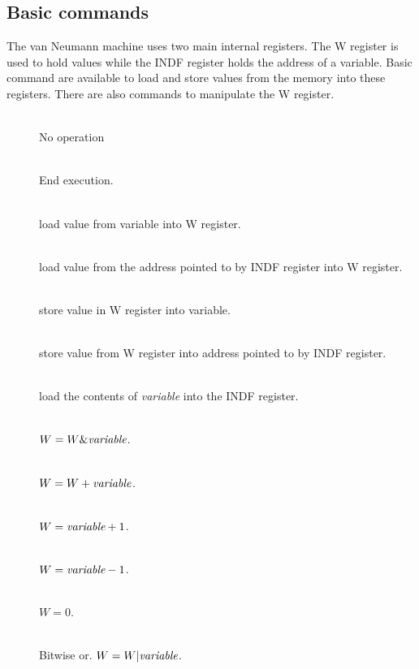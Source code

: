 \documentclass[11pt]{scrartcl}
\begin{document}
\subsection{Basic commands}
The van Neumann machine uses two main internal registers. The W register is used to hold values while the INDF register holds the address of a variable. Basic command are available to load and store values from the memory into these registers. There are also commands to manipulate the W register.

\begin{addmargin}{1cm}
\begin{description}
\item[] \hfill\\ 
  No operation

\item[]  \hfill\\  
End execution.

\item[ ] \hfill\\ 
 load value from variable into W register.

\item[]\hfill\\ 
load value from the address pointed to by INDF register into W register.

\item[ ] \hfill\\  
store value in W register into variable.

\item[] \hfill\\  
store value from W register into address pointed to by INDF register.

\item[ ] \hfill\\  
load the contents of {\it variable} into the INDF register.

\item[ ]  \hfill\\ 
 $W = W \& \text{{\it variable}}$.

\item[ ]  \hfill\\  
$W = W +  \text{{\it variable}}$.

\item[ ]  \hfill\\
$  W = \text{{\it variable}} + 1$.

\item[ ]  \hfill\\  
$W = \text{{\it variable}} - 1 $.

\item[]  \hfill\\  
$W = 0$.

\item[ ]\hfill\\  
Bitwise or. $ W = W | \text{\it variable}$.
\end{description}
\end{addmargin}
\end{document}
